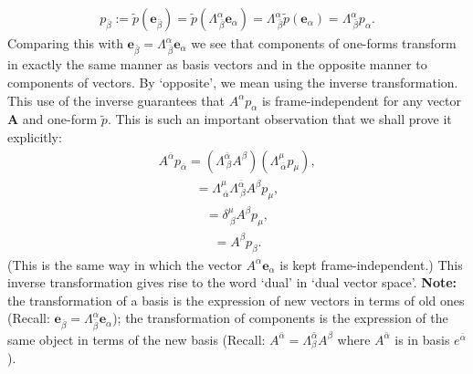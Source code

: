 \documentclass[12pt]{book}
\begin{document}
    \begin{align}
    p_{\bar{\beta}} := \tilde{p}(\mathbf{e}_{\bar{\beta}}) = \tilde{p}(\Lambda^\alpha_{\ \bar{\beta}} \mathbf{e}_\alpha)
    = \Lambda^\alpha_{\ \bar{\beta}} \tilde{p}(\mathbf{e}_\alpha) = \Lambda^\alpha_{\ \bar{\beta}} p_\alpha. \tag{3.9}
    \end{align}
    Comparing this with  \(\mathbf{e}_{\bar{\beta}} = \Lambda^\alpha_{\ \bar{\beta}} \mathbf{e}_\alpha\) we see that components of one-forms transform in exactly the same manner as basis vectors and in the opposite manner to components of vectors. By ‘opposite’, we mean using the inverse transformation. This use of the inverse guarantees that \(A^\alpha p_\alpha\) is frame-independent for any vector \(\mathbf{A}\) and one-form \(\tilde{p}\). This is such an important observation that we shall prove it explicitly:    \begin{align}
    A^{\bar{\alpha}} p_{\bar{\alpha}} = (\Lambda^{\bar{\alpha}}_{\ \beta} A^\beta)(\Lambda^\mu_{\ \bar{\alpha}} p_\mu), \tag{3.10a}
    \end{align}
    \begin{align}
    = \Lambda^\mu_{\ \bar{\alpha}} \Lambda^{\bar{\alpha}}_{\ \beta} A^\beta p_\mu, \tag{3.10b}
    \end{align}
    \begin{align}
    = \delta^\mu_{\ \beta} A^\beta p_\mu, \tag{3.10c}
    \end{align}
    \begin{align}
    = A^\beta p_\beta. \tag{3.10d}
    \end{align}
    (This is the same way in which the vector \(A^{\alpha} \mathbf{e}_{\alpha}\) is kept frame-independent.) This inverse transformation gives rise to the word ‘dual’ in ‘dual vector space’. \textbf{Note:} the transformation of a basis is the expression of new vectors in terms of old ones (Recall: \(\mathbf{e}_{\bar\beta} = \Lambda^{\alpha}_{\bar\beta} \mathbf{e}_{\alpha}\)); the transformation of components is the expression of the same object in terms of the new basis (Recall: \(A^{\bar\alpha}=\Lambda^{\bar\alpha}_{\beta} A^{\beta}\) where $A^{\bar\alpha}$ is in basis $e^{\bar\alpha}$).
\end{document}
